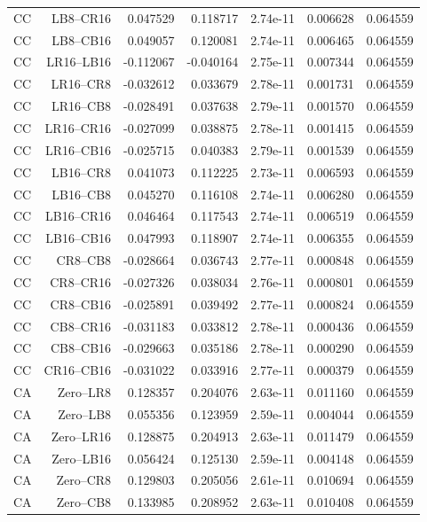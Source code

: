 {\begin{longtable}{lrrrrrr}
CC & LB8--CR16 & 0.047529 & 0.118717 & 2.74e-11 & 0.006628 & 0.064559 \\
CC & LB8--CB16 & 0.049057 & 0.120081 & 2.74e-11 & 0.006465 & 0.064559 \\
CC & LR16--LB16 & -0.112067 & -0.040164 & 2.75e-11 & 0.007344 & 0.064559 \\
CC & LR16--CR8 & -0.032612 & 0.033679 & 2.78e-11 & 0.001731 & 0.064559 \\
CC & LR16--CB8 & -0.028491 & 0.037638 & 2.79e-11 & 0.001570 & 0.064559 \\
CC & LR16--CR16 & -0.027099 & 0.038875 & 2.78e-11 & 0.001415 & 0.064559 \\
CC & LR16--CB16 & -0.025715 & 0.040383 & 2.79e-11 & 0.001539 & 0.064559 \\
CC & LB16--CR8 & 0.041073 & 0.112225 & 2.73e-11 & 0.006593 & 0.064559 \\
CC & LB16--CB8 & 0.045270 & 0.116108 & 2.74e-11 & 0.006280 & 0.064559 \\
CC & LB16--CR16 & 0.046464 & 0.117543 & 2.74e-11 & 0.006519 & 0.064559 \\
CC & LB16--CB16 & 0.047993 & 0.118907 & 2.74e-11 & 0.006355 & 0.064559 \\
CC & CR8--CB8 & -0.028664 & 0.036743 & 2.77e-11 & 0.000848 & 0.064559 \\
CC & CR8--CR16 & -0.027326 & 0.038034 & 2.76e-11 & 0.000801 & 0.064559 \\
CC & CR8--CB16 & -0.025891 & 0.039492 & 2.77e-11 & 0.000824 & 0.064559 \\
CC & CB8--CR16 & -0.031183 & 0.033812 & 2.78e-11 & 0.000436 & 0.064559 \\
CC & CB8--CB16 & -0.029663 & 0.035186 & 2.78e-11 & 0.000290 & 0.064559 \\
CC & CR16--CB16 & -0.031022 & 0.033916 & 2.77e-11 & 0.000379 & 0.064559 \\
CA & Zero--LR8 & 0.128357 & 0.204076 & 2.63e-11 & 0.011160 & 0.064559 \\
CA & Zero--LB8 & 0.055356 & 0.123959 & 2.59e-11 & 0.004044 & 0.064559 \\
CA & Zero--LR16 & 0.128875 & 0.204913 & 2.63e-11 & 0.011479 & 0.064559 \\
CA & Zero--LB16 & 0.056424 & 0.125130 & 2.59e-11 & 0.004148 & 0.064559 \\
CA & Zero--CR8 & 0.129803 & 0.205056 & 2.61e-11 & 0.010694 & 0.064559 \\
CA & Zero--CB8 & 0.133985 & 0.208952 & 2.63e-11 & 0.010408 & 0.064559 \\

\end{longtable}}
